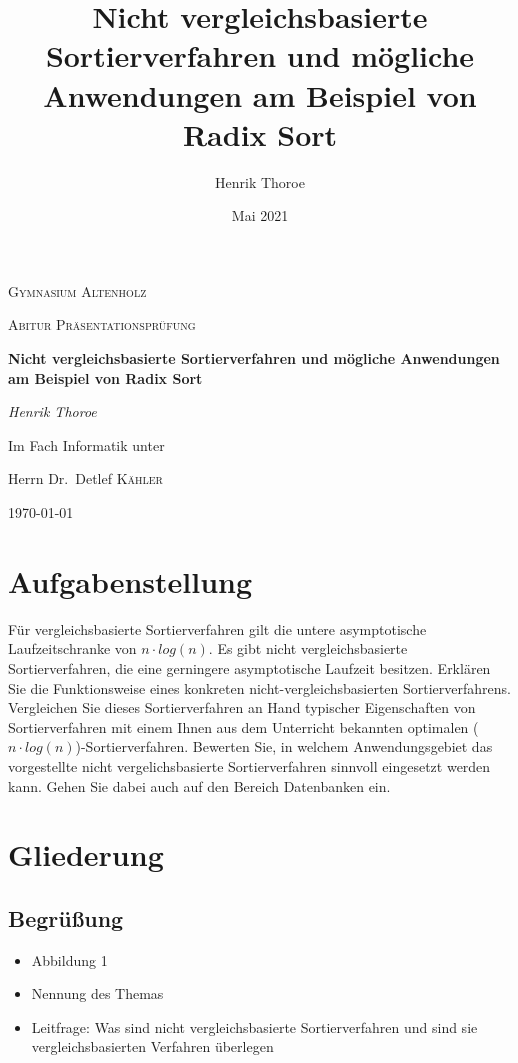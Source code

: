 \documentclass[a4paper, 12pt, oneside]{article}
\title{\bfseries Nicht vergleichsbasierte Sortierverfahren und mögliche Anwendungen am Beispiel von Radix Sort}
\author{Henrik Thoroe}
\date{Mai 2021}
\begin{document}
    \begin{titlepage}
        \centering
        {\scshape\LARGE Gymnasium Altenholz \par}
        \vspace{1cm}
        {\scshape\Large Abitur Präsentationsprüfung\par}
        \vspace{1.5cm}
        {\huge\bfseries Nicht vergleichsbasierte Sortierverfahren und mögliche Anwendungen am Beispiel von Radix Sort\par}
        \vspace{2cm}
        {\Large\itshape Henrik Thoroe\par}
        \vfill
        Im Fach Informatik unter\par
        Herrn Dr.~Detlef \textsc{Kähler}

        \vfill

        {\large \today\par}
    \end{titlepage}


    \section{Aufgabenstellung}

    Für vergleichsbasierte Sortierverfahren gilt die untere asymptotische Laufzeitschranke von $n \cdot log(n)$.
    Es gibt nicht vergleichsbasierte Sortierverfahren, die eine gerningere asymptotische Laufzeit besitzen.
    Erklären Sie die Funktionsweise eines konkreten nicht-vergleichsbasierten Sortierverfahrens.
    Vergleichen Sie dieses Sortierverfahren an Hand typischer Eigenschaften von Sortierverfahren mit
    einem Ihnen aus dem Unterricht bekannten optimalen ($n \cdot log(n)$)-Sortierverfahren.
    Bewerten Sie, in welchem Anwendungsgebiet das vorgestellte nicht vergelichsbasierte Sortierverfahren
    sinnvoll eingesetzt werden kann. Gehen Sie dabei auch auf den Bereich Datenbanken ein.


    \section{Gliederung}

    \subsection{Begrüßung}

    \begin{itemize}
        \item Abbildung 1
        \item Nennung des Themas
        \item Leitfrage: Was sind nicht vergleichsbasierte Sortierverfahren und sind sie vergleichsbasierten Verfahren überlegen
    \end{itemize}
\end{document}
